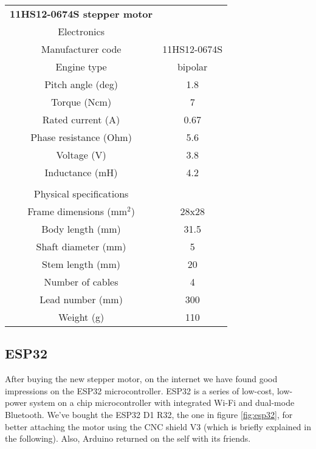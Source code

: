 \begin{minipage}{0.5\textwidth}
    \centering
    \begin{tabular}{cc}
        \textbf{11HS12-0674S stepper motor}&\\
        Electronics&\\
        \hline
        Manufacturer code & 11HS12-0674S\\
        Engine type & bipolar\\
        Pitch angle (deg) & 1.8 \\
        Torque (Ncm)& 7\\
        Rated current (A) & 0.67\\
        Phase resistance (Ohm)& 5.6\\
        Voltage (V)& 3.8\\
        Inductance (mH)& 4.2\\
         & \\
        Physical specifications&\\
        \hline
        Frame dimensions (mm\(^2\))& 28x28 \\
        Body length (mm)& 31.5 \\
        Shaft diameter (mm)& 5 \\
        Stem length (mm)& 20 \\
        Number of cables & 4\\
        Lead number (mm)& 300 \\
        Weight (g) & 110\\
        \hline
    \end{tabular}
    \label{tab:nema_11_specifics}
\end{minipage}

\subsection{ESP32}
After buying the new stepper motor, on the internet we have found good impressions on the ESP32 microcontroller.
ESP32 is a series of low-cost, low-power system on a chip microcontroller with integrated Wi-Fi and dual-mode Bluetooth.
We've bought the ESP32 D1 R32, the one in figure \ref{fig:esp32}, for better attaching the motor using the CNC shield V3 (which is briefly explained in the following).
Also, Arduino returned on the self with its friends.

